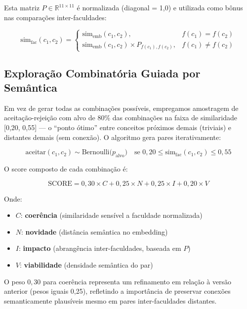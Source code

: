 \documentclass[a4paper,12pt]{article}
\begin{document}
Esta matriz $P \in \mathbb{R}^{11 \times 11}$ é normalizada (diagonal = 1,0) e utilizada 
como bônus nas comparações inter-faculdades:

\begin{equation}
    \text{sim}_\text{fac}(c_1, c_2) = 
    \begin{cases}
        \text{sim}_\text{emb}(c_1, c_2), & f(c_1) = f(c_2) \\
        \text{sim}_\text{emb}(c_1, c_2) \times P_{f(c_1),f(c_2)}, & f(c_1) \neq f(c_2)
    \end{cases}
\end{equation}

\subsection{Exploração Combinatória Guiada por Semântica}

Em vez de gerar todas as combinações possíveis, empregamos amostragem de 
aceitação-rejeição com alvo de 80\% das combinações na faixa de similaridade 
[0,20, 0,55] --- o ``ponto ótimo'' entre conceitos próximos demais (triviais) 
e distantes demais (sem conexão). O algoritmo gera pares iterativamente:

\begin{equation}
    \text{aceitar}(c_1, c_2) \sim \text{Bernoulli}\bigl(p_{\text{alvo}}\bigr)
    \quad\text{se } 0,20 \leq \text{sim}_\text{fac}(c_1, c_2) \leq 0,55
\end{equation}

O score composto de cada combinação é:

\begin{equation}
    \text{SCORE} = 0{,}30 \times C + 0{,}25 \times N + 0{,}25 \times I + 0{,}20 \times V
\label{eq:score}
\end{equation}

Onde:
\begin{itemize}
    \item $C$: \textbf{coerência} (similaridade sensível a faculdade normalizada)
    \item $N$: \textbf{novidade} (distância semântica no embedding)
    \item $I$: \textbf{impacto} (abrangência inter-faculdades, baseada em $P$)
    \item $V$: \textbf{viabilidade} (densidade semântica do par)
\end{itemize}

O peso $0{,}30$ para coerência representa um refinamento em relação à versão anterior 
(pesos iguais 0,25), refletindo a importância de preservar conexões semanticamente 
plausíveis mesmo em pares inter-faculdades distantes.
\end{document}
